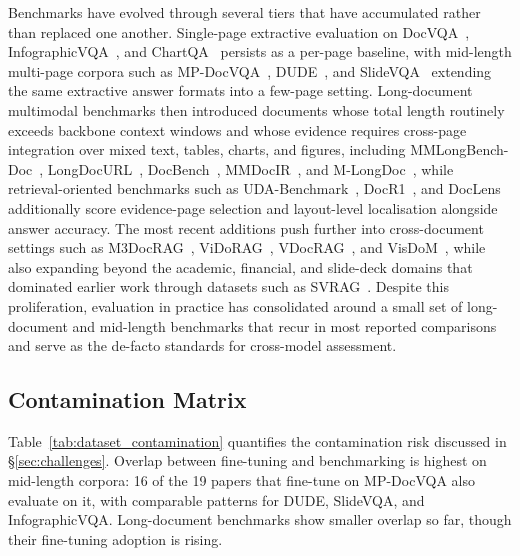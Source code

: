 \documentclass[11pt]{article}
\begin{document}
Benchmarks have evolved through several tiers that have accumulated rather than replaced one another. Single-page extractive evaluation on DocVQA~\cite{mathew2021docvqa}, InfographicVQA~\cite{mathew2022infographicvqa}, and ChartQA~\cite{masry2022chartqa} persists as a per-page baseline, with mid-length multi-page corpora such as MP-DocVQA~\cite{tito2023hierarchical}, DUDE~\cite{van2023dude}, and SlideVQA~\cite{tanaka2023slidevqa} extending the same extractive answer formats into a few-page setting. Long-document multimodal benchmarks then introduced documents whose total length routinely exceeds backbone context windows and whose evidence requires cross-page integration over mixed text, tables, charts, and figures, including MMLongBench-Doc~\cite{ma2024mmlongbench}, LongDocURL~\cite{deng2025longdocurl}, DocBench~\cite{zou2024docbench}, MMDocIR~\cite{dong2025mmdocir}, and M-LongDoc~\cite{chia2025m}, while retrieval-oriented benchmarks such as UDA-Benchmark~\cite{hui2024uda}, DocR1~\cite{xiong2026docr1}, and DocLens~\cite{zhu2025doclens} additionally score evidence-page selection and layout-level localisation alongside answer accuracy. The most recent additions push further into cross-document settings such as M3DocRAG~\cite{cho2024m3docrag}, ViDoRAG~\cite{wang2025vidorag}, VDocRAG~\cite{tanaka2025vdocrag}, and VisDoM~\cite{suri2025visdom}, while also expanding beyond the academic, financial, and slide-deck domains that dominated earlier work through datasets such as SVRAG~\cite{chen2025svrag}. Despite this proliferation, evaluation in practice has consolidated around a small set of long-document and mid-length benchmarks that recur in most reported comparisons and serve as the de-facto standards for cross-model assessment. 


\subsection{Contamination Matrix}
Table~\ref{tab:dataset_contamination} quantifies the contamination risk discussed in \S\ref{sec:challenges}. Overlap between fine-tuning and benchmarking is highest on mid-length corpora: 16 of the 19 papers that fine-tune on MP-DocVQA also evaluate on it, with comparable patterns for DUDE, SlideVQA, and InfographicVQA. Long-document benchmarks show smaller overlap so far, though their fine-tuning adoption is rising.
\label{app:contamination}








\end{document}
